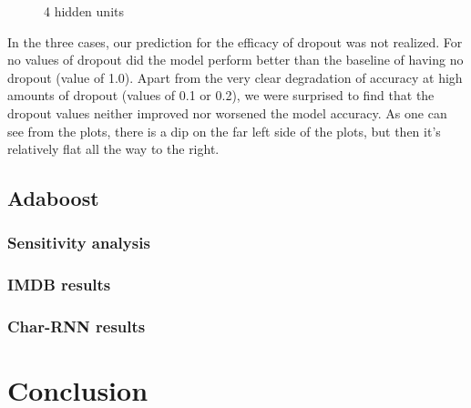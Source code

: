 \documentclass[a4paper,12pt]{article}
\begin{document}
\begin{figure}[!htb]
	\caption{4 hidden units}\label{fig:awesome_image3}
	\endminipage
\end{figure}

In the three cases, our prediction for the efficacy of dropout was not realized. For no values of dropout did the model perform better than the baseline of having no dropout (value of 1.0). Apart from the very clear degradation of accuracy at high amounts of dropout (values of 0.1 or 0.2), we were surprised to find that the dropout values neither improved nor worsened the model accuracy. As one can see from the plots, there is a dip on the far left side of the plots, but then it's relatively flat all the way to the right. 



\subsection{Adaboost}
\subsubsection{Sensitivity analysis}

\subsubsection{IMDB results}


\subsubsection{Char-RNN results}




\section{Conclusion}
\label{sec:conclusion}



{\small


}
\end{document}
